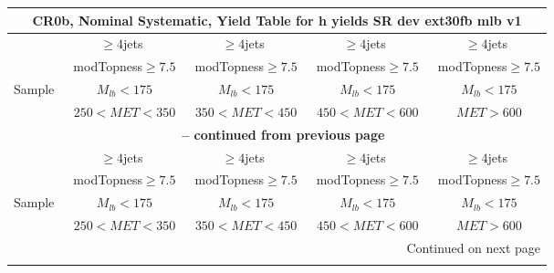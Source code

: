 \documentclass{article}
\begin{document}
\begin{longtable}{|l|c|c|c|c|} 
 
\multicolumn{5}{c}{ CR0b, Nominal Systematic, Yield Table for h yields SR dev ext30fb mlb v1 }\\* \hline 
  & $\ge4$jets  & $\ge4$jets  & $\ge4$jets  & $\ge4$jets \\* 
  & ~modTopness$\ge7.5$  & ~modTopness$\ge7.5$  & ~modTopness$\ge7.5$  & ~modTopness$\ge7.5$ \\* 
Sample  & ~$M_{lb}<175$  & ~$M_{lb}<175$  & ~$M_{lb}<175$  & ~$M_{lb}<175$ \\* 
  & ~$250<MET<350$  & ~$350<MET<450$  & ~$450<MET<600$  & ~$MET>600$ \\* 
\hline \hline 
\endfirsthead 
 
\multicolumn{5}{c}{{\bfseries \tablename\ \thetable{} -- continued from previous page}}\\* \hline 
  & $\ge4$jets  & $\ge4$jets  & $\ge4$jets  & $\ge4$jets \\* 
  & ~modTopness$\ge7.5$  & ~modTopness$\ge7.5$  & ~modTopness$\ge7.5$  & ~modTopness$\ge7.5$ \\* 
Sample  & ~$M_{lb}<175$  & ~$M_{lb}<175$  & ~$M_{lb}<175$  & ~$M_{lb}<175$ \\* 
  & ~$250<MET<350$  & ~$350<MET<450$  & ~$450<MET<600$  & ~$MET>600$ \\* 
\hline \hline 
\endhead 
 
\multicolumn{5}{|r|}{{Continued on next page}}\\* \hline 
\endfoot 
 
 
\endlastfoot 
 

\end{longtable}
\end{document}
